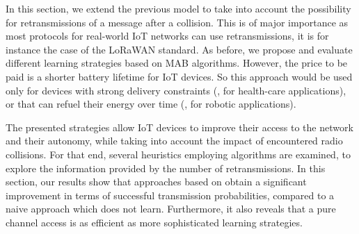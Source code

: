 
\graphicspath{{2-Chapters/4-Chapter/IEEE_WCNC__2019__Paper__BMBM.git/}}

In this section, we extend the previous model to take into account the possibility for retransmissions of a message after a collision.
This is of major importance as most protocols for real-world IoT networks can use retransmissions, it is for instance the case of the LoRaWAN standard.
As before, we propose and evaluate different learning strategies based on MAB algorithms.
However, the price to be paid is a shorter battery lifetime for IoT devices. So this approach would be used only for devices with strong delivery constraints (\eg, for health-care applications), or that can refuel their energy over time (\eg, for robotic applications).

The presented strategies allow IoT devices to improve their access to the network and their autonomy, while taking into account the impact of encountered radio collisions.
For that end, several heuristics employing \UCB{} algorithms are examined, to explore the information provided by the number of retransmissions.
In this section, our results show that approaches based on \UCB{} obtain a significant improvement in terms of successful transmission probabilities, compared to a naive approach which does not learn.
Furthermore, it also reveals that a pure \UCB{} channel access is as efficient as more sophisticated learning strategies.





